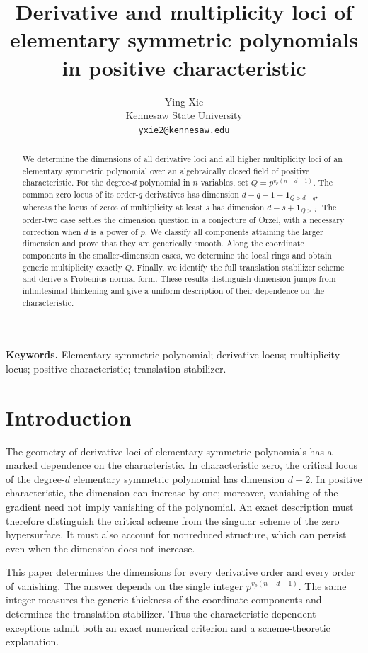 \documentclass[11pt]{article}
\title{Derivative and multiplicity loci of elementary symmetric polynomials in positive characteristic}
\author{Ying Xie\\Kennesaw State University\\\texttt{yxie2@kennesaw.edu}}
\date{}
\theoremstyle{remark}
\newcommand{\ind}{\mathbf 1}
\begin{document}
\maketitle
\begin{abstract}
We determine the dimensions of all derivative loci and all higher
multiplicity loci of an elementary symmetric polynomial over an
algebraically closed field of positive characteristic. For the degree-$d$
polynomial in $n$ variables, set $Q=p^{v_p(n-d+1)}$. The common zero
locus of its order-$q$ derivatives has dimension
$d-q-1+\ind_{Q>d-q}$, whereas the locus of zeros of multiplicity at
least $s$ has dimension $d-s+\ind_{Q>d}$. The order-two case settles
the dimension question in a conjecture of Orzel, with a necessary
correction when $d$ is a power of $p$. We classify all components
attaining the larger dimension and prove that they are generically
smooth. Along the coordinate components in the smaller-dimension
cases, we determine the local rings and obtain generic multiplicity
exactly $Q$. Finally, we identify the full translation stabilizer
scheme and derive a Frobenius normal form. These results distinguish
dimension jumps from infinitesimal thickening and give a uniform
description of their dependence on the characteristic.
\end{abstract}

\medskip
\noindent\textbf{Keywords.} Elementary symmetric polynomial; derivative
locus; multiplicity locus; positive characteristic; translation stabilizer.

\section{Introduction}

The geometry of derivative loci of elementary symmetric polynomials
has a marked dependence on the characteristic. In characteristic zero,
the critical locus of the degree-$d$ elementary symmetric polynomial
has dimension $d-2$. In positive characteristic, the dimension can
increase by one; moreover, vanishing of the gradient need not imply
vanishing of the polynomial. An exact description must therefore
distinguish the critical scheme from the singular scheme of the
zero hypersurface. It must also account for nonreduced structure,
which can persist even when the dimension does not increase.

This paper determines the dimensions for every derivative order and
every order of vanishing. The answer depends on the single integer
$p^{v_p(n-d+1)}$. The same integer measures the generic thickness of
the coordinate components and determines the translation stabilizer.
Thus the characteristic-dependent exceptions admit both an exact
numerical criterion and a scheme-theoretic explanation.
\end{document}
